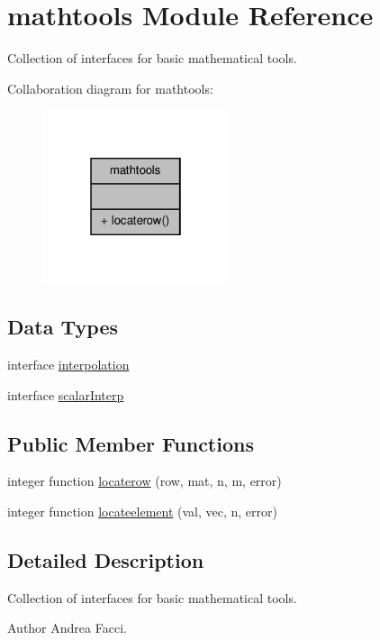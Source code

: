 \hypertarget{classmathtools}{\section{mathtools Module Reference}
\label{classmathtools}
}


Collection of interfaces for basic mathematical tools.  




Collaboration diagram for mathtools\-:\nopagebreak
\begin{figure}[H]
\begin{center}
\leavevmode
\includegraphics[width=154pt]{classmathtools__coll__graph}
\end{center}
\end{figure}
\subsection*{Data Types}
\begin{DoxyCompactItemize}
\item 
interface \hyperlink{interfacemathtools_1_1interpolation}{interpolation}
\item 
interface \hyperlink{interfacemathtools_1_1scalar_interp}{scalar\-Interp}
\end{DoxyCompactItemize}
\subsection*{Public Member Functions}
\begin{DoxyCompactItemize}
\item 
integer function \hyperlink{classmathtools_a64c72087c0180d1e0cfbd7356d8a1a5a}{locaterow} (row, mat, n, m, error)
\item 
integer function \hyperlink{classmathtools_a58ee6953f2a70383a6026b1cbb377058}{locateelement} (val, vec, n, error)
\end{DoxyCompactItemize}


\subsection{Detailed Description}
Collection of interfaces for basic mathematical tools. \begin{DoxyAuthor}{Author}
Andrea Facci. 
\end{DoxyAuthor}


